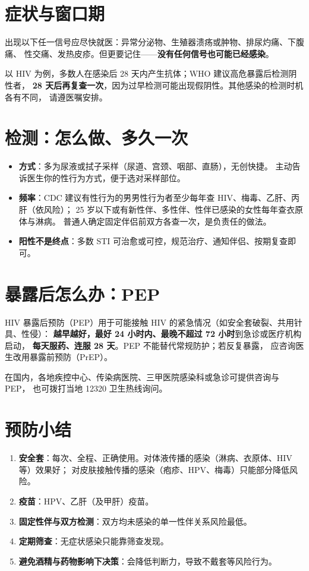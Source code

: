 \documentclass[12pt,UTF8,openany]{ctexbook}
\begin{document}
\section{症状与窗口期}

出现以下任一信号应尽快就医：异常分泌物、生殖器溃疡或肿物、排尿灼痛、下腹痛、
性交痛、发热皮疹。但更要记住——\textbf{没有任何信号也可能已经感染}。

以 HIV 为例，多数人在感染后 28 天内产生抗体；WHO 建议高危暴露后检测阴性者，
\textbf{28 天后再复查一次}，因为过早检测可能出现假阴性。其他感染的检测时机各有不同，
请遵医嘱安排。

\section{检测：怎么做、多久一次}

\begin{itemize}[leftmargin=2em]
  \item \textbf{方式}：多为尿液或拭子采样（尿道、宫颈、咽部、直肠），无创快捷。
        主动告诉医生你的性行为方式，便于选对采样部位。
  \item \textbf{频率}：CDC 建议有性行为的男男性行为者至少每年查 HIV、梅毒、乙肝、丙肝（依风险）；
        25 岁以下或有新性伴、多性伴、性伴已感染的女性每年查衣原体与淋病。
        普通人确定固定伴侣前双方各查一次，是负责任的做法。
  \item \textbf{阳性不是终点}：多数 STI 可治愈或可控，规范治疗、通知伴侣、按期复查即可。
\end{itemize}

\section{暴露后怎么办：PEP}

HIV 暴露后预防（PEP）用于可能接触 HIV 的紧急情况（如安全套破裂、共用针具、性侵）：
\textbf{越早越好，最好 24 小时内、最晚不超过 72 小时}到急诊或医疗机构启动，
\textbf{每天服药、连服 28 天}。PEP 不能替代常规防护；若反复暴露，
应咨询医生改用暴露前预防（PrEP）。

在国内，各地疾控中心、传染病医院、三甲医院感染科或急诊可提供咨询与 PEP，
也可拨打当地 12320 卫生热线询问。

\section{预防小结}

\begin{enumerate}[leftmargin=2em,itemsep=0.3em]
  \item \textbf{安全套}：每次、全程、正确使用。对体液传播的感染（淋病、衣原体、HIV 等）效果好；
        对皮肤接触传播的感染（疱疹、HPV、梅毒）只能部分降低风险。
  \item \textbf{疫苗}：HPV、乙肝（及甲肝）疫苗。
  \item \textbf{固定性伴与双方检测}：双方均未感染的单一性伴关系风险最低。
  \item \textbf{定期筛查}：无症状感染只能靠筛查发现。
  \item \textbf{避免酒精与药物影响下决策}：会降低判断力，导致不戴套等风险行为。
\end{enumerate}
\end{document}
